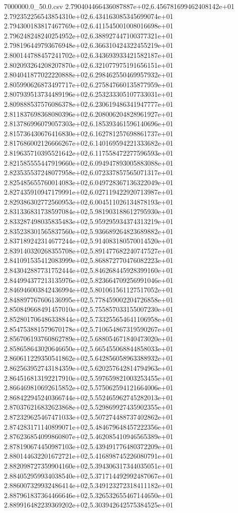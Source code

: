 \begin{filecontents*}{7000000.0_50.0.csv}
2.790404466436087887e+02,6.456781699462408142e+01
2.792352256543854310e+02,6.434163085345699074e+01
2.794300183817467769e+02,6.411545001008016698e+01
2.796248248240254952e+02,6.388927447100377321e+01
2.798196449793676948e+02,6.366310424322455219e+01
2.800144788457241702e+02,6.343693933421582187e+01
2.802093264208207870e+02,6.321077975191656151e+01
2.804041877022220888e+02,6.298462550469957932e+01
2.805990626873497717e+02,6.275847660135877959e+01
2.807939513734489196e+02,6.253233305107733031e+01
2.809888537576086378e+02,6.230619486341947777e+01
2.811837698368080396e+02,6.208006204828961927e+01
2.813786996079057303e+02,6.185393461596140696e+01
2.815736430676416830e+02,6.162781257698861737e+01
2.817686002126666267e+02,6.140169594221333682e+01
2.819635710395521642e+02,6.117558472277596593e+01
2.821585555447919660e+02,6.094947893005883088e+01
2.823535537248077958e+02,6.072337857565071317e+01
2.825485655760014083e+02,6.049728367136322049e+01
2.827435910947179991e+02,6.027119422920713987e+01
2.829386302772560953e+02,6.004511026134878193e+01
2.831336831738597084e+02,5.981903188612795930e+01
2.833287498035835483e+02,5.959295934374313219e+01
2.835238301565837560e+02,5.936689264823689882e+01
2.837189242314677244e+02,5.914083180570014520e+01
2.839140320268355708e+02,5.891477682240747527e+01
2.841091535412083999e+02,5.868872770476082223e+01
2.843042887731752444e+02,5.846268445928399160e+01
2.844994377213135976e+02,5.823664709256991046e+01
2.846946003842436994e+02,5.801061561127517052e+01
2.848897767606136995e+02,5.778459002204726858e+01
2.850849668491457010e+02,5.755857033155007230e+01
2.852801706486338844e+02,5.733255654641106958e+01
2.854753881579670178e+02,5.710654867319590267e+01
2.856706193760862789e+02,5.688054671840473020e+01
2.858658643020646650e+02,5.665455068844858033e+01
2.860611229350541862e+02,5.642856058963388932e+01
2.862563952743184359e+02,5.620257642814794963e+01
2.864516813192217910e+02,5.597659821003253455e+01
2.866469810692615852e+02,5.575062594121664006e+01
2.868422945240366744e+02,5.552465962745282013e+01
2.870376216832623868e+02,5.529869927435902355e+01
2.872329625467471033e+02,5.507274488737402862e+01
2.874283171140899071e+02,5.484679648457222356e+01
2.876236854099860807e+02,5.462085410946565389e+01
2.878190674450987103e+02,5.439491776480372209e+01
2.880144632201672721e+02,5.416898745226080791e+01
2.882098727359904160e+02,5.394306317344035051e+01
2.884052959934038540e+02,5.371714492992487067e+01
2.886007329932486414e+02,5.349123272318411182e+01
2.887961837364466646e+02,5.326532655467144650e+01
2.889916482239369202e+02,5.303942642575384525e+01

\end{filecontents*}
